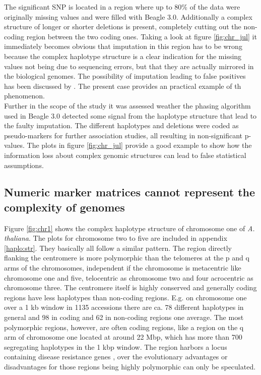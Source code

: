 The significant SNP is located in a region where up to 80\% of the data were originally
missing values and were filled with Beagle 3.0. Additionally a complex structure of longer
or shorter deletions is present, completely cutting out the non-coding region between the
two coding ones. Taking a look at figure \ref{fig:chr_jul} it immediately becomes obvious
that imputation in this region has to be wrong because the complex haplotype structure is
a clear indication for the missing values not being due to sequencing errors, but that
they are actually mirrored in the biological genomes. The possibility of imputation
leading to false positives has been discussed by \cite{lin2010new}. The present case
provides an practical example of th phenomenon. \\
Further in the scope of the study it was assessed weather the phasing algorithm used in
Beagle 3.0 detected some signal from the haplotype structure that lead to the faulty
imputation. The different haplotypes and deletions were coded as pseudo-markers for
further association studies, all resulting in non-significant p-values. The plots in
figure \ref{fig:chr_jul} provide a good example to show how the information loss about
complex genomic structures can lead to false statistical assumptions.

\subsection{Numeric marker matrices cannot represent the complexity of genomes}

Figure \ref{fig:chr1} shows the complex haplotype structure of chromosome one of
\textit{A. thaliana}. The plots for chromosome two to five are included in appendix
\ref{haplo:str}. They basically all follow a similar pattern. The region directly flanking
the centromere is more polymorphic than the telomeres at the p and q arms of the
chromosomes, independent if the chromosome is metacentric like chromosome one and five,
telocentric as chromosome two and four acrocentric as chromosome three. The centromere
itself is highly conserved and generally coding regions have less haplotypes than
non-coding regions. E.g. on chromosome one over a 1 kb window in 1135 accessions there are ca. 78 different haplotypes in general and 98 in coding and 62 in non-coding
regions one average. The most polymorphic regions, however, are often coding regions, like
a region on the q arm of chromosome one located at around 22 Mbp, which has more than 700
segregating haplotypes in the 1 kbp window. The region harbors a locus containing disease
resistance genes \cite{cheng2017araport11}, over the evolutionary advantages or
disadvantages for those regions being highly polymorphic can only be speculated. 

